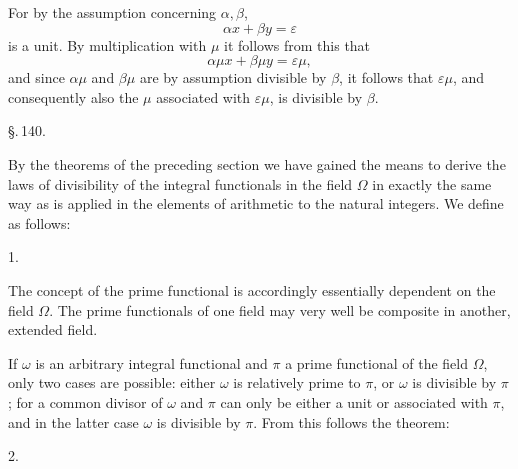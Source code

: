 
For by the assumption concerning $\alpha, \beta$,
\[ \alpha x + \beta y = \varepsilon \]
is a unit. By multiplication with $\mu$ it follows from this that
\[ \alpha \mu x + \beta \mu y = \varepsilon \mu, \]
and since $\alpha \mu$ and $\beta \mu$ are by assumption divisible by $\beta$, it follows that $\varepsilon \mu$, and consequently also the $\mu$ associated with $\varepsilon \mu$, is divisible by $\beta$.

\begin{center}
\S.\,140.

\end{center}

By the theorems of the preceding section we have gained the means to derive the laws of divisibility of the integral functionals in the field $\Omega$ in exactly the same way as is applied in the elements of arithmetic to the natural integers. We define as follows:

1. 

The concept of the prime functional is accordingly essentially dependent on the field $\Omega$. The prime functionals of one field may very well be composite in another, extended field.

If $\omega$ is an arbitrary integral functional and $\pi$ a prime functional of the field $\Omega$, only two cases are possible: either $\omega$ is relatively prime to $\pi$, or $\omega$ is divisible by $\pi$; for a common divisor of $\omega$ and $\pi$ can only be either a unit or associated with $\pi$, and in the latter case $\omega$ is divisible by $\pi$. From this follows the theorem:

2. 

